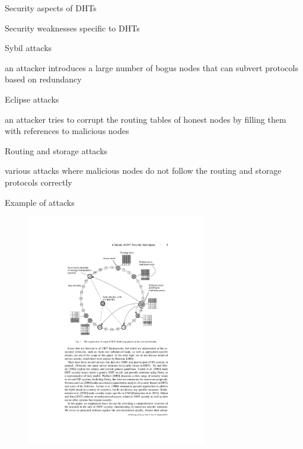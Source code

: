 \begin{frame}{Security aspects of DHTs}

\begin{block}{Security weaknesses specific to DHTs}
\BI
\item \alert{Sybil} attacks
	\BI
	\item an attacker introduces a large number of bogus nodes that can subvert protocols based on redundancy
	\EI
\item \alert{Eclipse} attacks
	\BI 
	\item an attacker tries to corrupt the routing tables of honest nodes by filling them with references to malicious nodes
	\EI
\item \alert{Routing} and \alert{storage} attacks 
	\BI
	\item various attacks where malicious nodes do not follow the routing and storage protocols correctly
	\EI
\EI
\end{block}

\smallskip
\begin{Bib}
{\scriptsize
}
\end{Bib}

\end{frame}

\begin{frame}{Example of attacks}
	
\begin{figure}
	\includegraphics[width=0.7\textwidth]{figs/10/dht-security}
\end{figure}

\end{frame}


